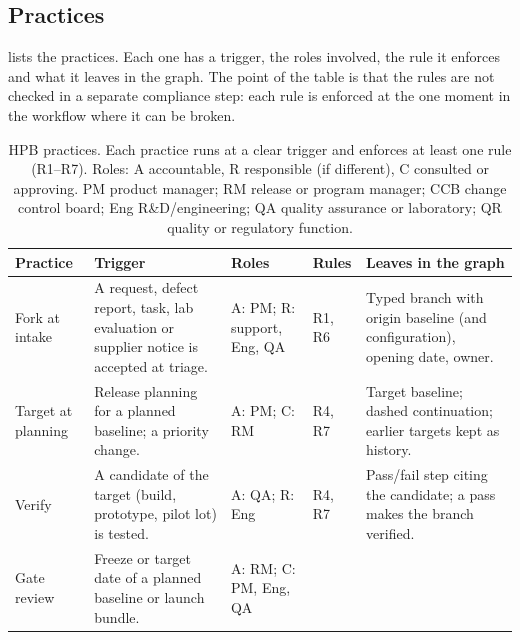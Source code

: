 \subsection{Practices}
\label{subsec:method-practices}

 lists the practices. Each one has a trigger, the
roles involved, the rule it enforces and what it leaves in the graph.
The point of the table is that the rules are not checked in a separate
compliance step: each rule is enforced at the one moment in the workflow
where it can be broken.

\begin{table}[tbp]
  \centering
  \small
  \caption{HPB practices. Each practice runs at a clear trigger and enforces
    at least one rule (R1--R7). Roles: A accountable, R responsible (if
    different), C consulted or approving. PM product manager; RM release or
    program manager; CCB change control board; Eng R\&D/engineering; QA
    quality assurance or laboratory; QR quality or regulatory function.}
  \label{tab:practices}
  \begin{tabularx}{\linewidth}{@{}>{\raggedright\arraybackslash}p{2.0cm}
                                  >{\raggedright\arraybackslash}X
                                  >{\raggedright\arraybackslash}p{2.2cm}
                                  >{\raggedright\arraybackslash}p{1.0cm}
                                  >{\raggedright\arraybackslash}X@{}}
    \toprule
    \textbf{Practice} & \textbf{Trigger} & \textbf{Roles} & \textbf{Rules} & \textbf{Leaves in the graph} \\
    \midrule
    Fork at intake
      & A request, defect report, task, lab evaluation or supplier notice is accepted at triage.
      & A: PM; R: support, Eng, QA
      & R1, R6
      & Typed branch with origin baseline (and configuration), opening date, owner. \\
    \addlinespace
    Target at planning
      & Release planning for a planned baseline; a priority change.
      & A: PM; C: RM
      & R4, R7
      & Target baseline; dashed continuation; earlier targets kept as history. \\
    \addlinespace
    Verify
      & A candidate of the target (build, prototype, pilot lot) is tested.
      & A: QA; R: Eng
      & R4, R7
      & Pass/fail step citing the candidate; a pass makes the branch verified. \\
    \addlinespace
    Gate review
      & Freeze or target date of a planned baseline or launch bundle.
      & A: RM; C: PM, Eng, QA

\end{tabularx}
\end{table}
